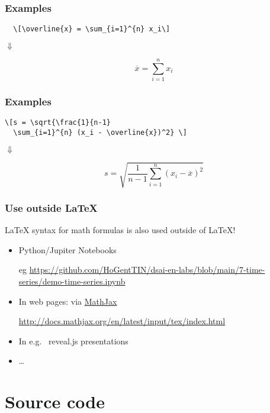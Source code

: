 \documentclass[aspectratio=169]{beamer}
\begin{document}
\begin{frame}[fragile]
  \frametitle{Examples}

\begin{verbatim}
  \[\overline{x} = \sum_{i=1}^{n} x_i\]
\end{verbatim}

  \bigskip

  \centering
  $\Downarrow$

  \bigskip

  \[\overline{x} = \sum_{i=1}^{n} x_i\]

\end{frame}

\begin{frame}[fragile]
  \frametitle{Examples}

\begin{verbatim}
\[s = \sqrt{\frac{1}{n-1} 
  \sum_{i=1}^{n} (x_i - \overline{x})^2} \]
\end{verbatim}

  \bigskip

  \centering
  $\Downarrow$

  \bigskip

  \[s = \sqrt{\frac{1}{n-1} \sum_{i=1}^{n} (x_i - \overline{x})^2} \]

\end{frame}

\begin{frame}
  \frametitle{Use outside {\LaTeX}}

{\LaTeX} syntax for math formulas is also used outside of {\LaTeX}!

  \begin{itemize}
   \item Python/Jupiter Notebooks
   
   eg \url{https://github.com/HoGentTIN/dsai-en-labs/blob/main/7-time-series/demo-time-series.ipynb}
   
   \item In web pages: via \href{https://www.mathjax.org}{MathJax}
   
   \url{http://docs.mathjax.org/en/latest/input/tex/index.html}
   
   \item In e.g. ~reveal.js presentations
    \item \ldots
  \end{itemize}

\end{frame}

\section{Source code}
\end{document}
